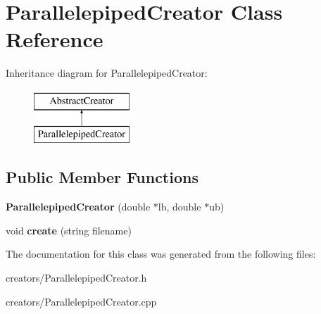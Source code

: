 \hypertarget{class_parallelepiped_creator}{}\section{Parallelepiped\+Creator Class Reference}
\label{class_parallelepiped_creator}
Inheritance diagram for Parallelepiped\+Creator\+:\begin{figure}[H]
\begin{center}
\leavevmode
\includegraphics[height=2.000000cm]{class_parallelepiped_creator}
\end{center}
\end{figure}
\subsection*{Public Member Functions}
\begin{DoxyCompactItemize}
\item 
\mbox{\label{class_parallelepiped_creator_a90c756a533fe6590d1ea2cd236c4762f}} 
{\bfseries Parallelepiped\+Creator} (double $\ast$lb, double $\ast$ub)
\item 
\mbox{\label{class_parallelepiped_creator_a12a54b7a1d66ac413c30327751d8ad47}} 
void {\bfseries create} (string filename)
\end{DoxyCompactItemize}


The documentation for this class was generated from the following files\+:\begin{DoxyCompactItemize}
\item 
creators/Parallelepiped\+Creator.\+h\item 
creators/Parallelepiped\+Creator.\+cpp\end{DoxyCompactItemize}
